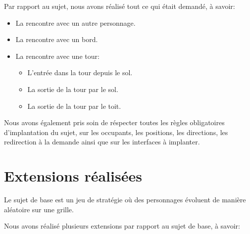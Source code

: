 Par rapport au sujet, nous avons réalisé tout ce qui était demandé, à savoir:

\begin{itemize}
    \item La rencontre avec un autre personnage.
    \item La rencontre avec un bord.
    \item La rencontre avec une tour:
    \begin{itemize}
        \item L'entrée dans la tour depuis le sol.
        \item La sortie de la tour par le sol.
        \item La sortie de la tour par le toit.
    \end{itemize}
\end{itemize}
\bigskip

Nous avons également pris soin de réspecter toutes les règles obligatoires d'implantation du sujet, sur les occupants, les positions, les directions, les redirection à la demande ainsi que sur les interfaces à implanter.

\section{Extensions réalisées}

Le sujet de base est un jeu de stratégie où des personnages évoluent de manière aléatoire sur une grille.

Nous avons réalisé plusieurs extensions par rapport au sujet de base, à savoir:

